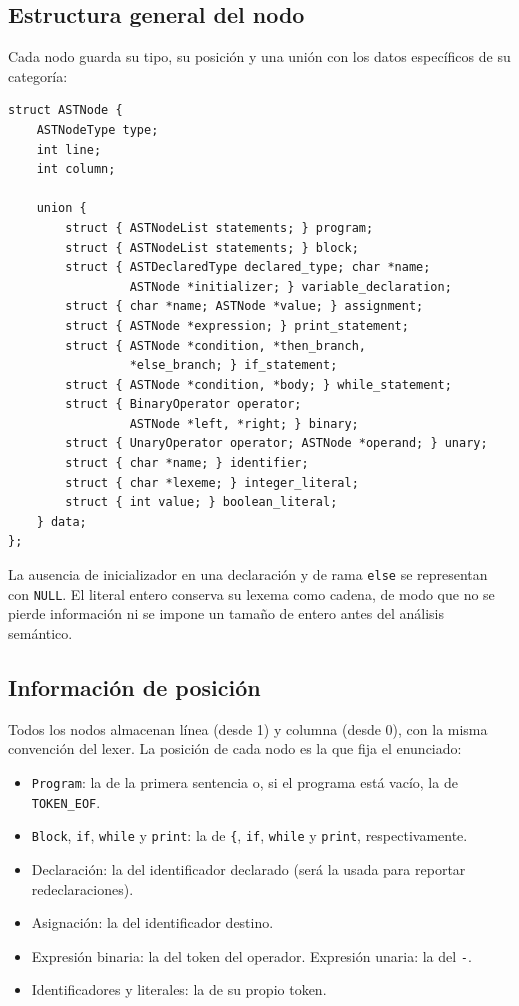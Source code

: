 \documentclass[12pt,letterpaper]{article}
\begin{document}
\subsection*{Estructura general del nodo}

Cada nodo guarda su tipo, su posición y una unión con los datos específicos de su categoría:

\begin{lstlisting}[style=modernc, caption={Estructura \texttt{ASTNode} (resumida).}]
struct ASTNode {
    ASTNodeType type;
    int line;
    int column;

    union {
        struct { ASTNodeList statements; } program;
        struct { ASTNodeList statements; } block;
        struct { ASTDeclaredType declared_type; char *name;
                 ASTNode *initializer; } variable_declaration;
        struct { char *name; ASTNode *value; } assignment;
        struct { ASTNode *expression; } print_statement;
        struct { ASTNode *condition, *then_branch,
                 *else_branch; } if_statement;
        struct { ASTNode *condition, *body; } while_statement;
        struct { BinaryOperator operator;
                 ASTNode *left, *right; } binary;
        struct { UnaryOperator operator; ASTNode *operand; } unary;
        struct { char *name; } identifier;
        struct { char *lexeme; } integer_literal;
        struct { int value; } boolean_literal;
    } data;
};
\end{lstlisting}

\bigskip

La ausencia de inicializador en una declaración y de rama \texttt{else} se representan con \texttt{NULL}. El
literal entero conserva su lexema como cadena, de modo que no se pierde información ni se impone un tamaño de
entero antes del análisis semántico.

\subsection*{Información de posición}

Todos los nodos almacenan línea (desde 1) y columna (desde 0), con la misma convención del lexer. La posición
de cada nodo es la que fija el enunciado:

\begin{itemize}
\item \texttt{Program}: la de la primera sentencia o, si el programa está vacío, la de \texttt{TOKEN\_EOF}.
\item \texttt{Block}, \texttt{if}, \texttt{while} y \texttt{print}: la de \texttt{\{}, \texttt{if},
  \texttt{while} y \texttt{print}, respectivamente.
\item Declaración: la del identificador declarado (será la usada para reportar redeclaraciones).
\item Asignación: la del identificador destino.
\item Expresión binaria: la del token del operador. Expresión unaria: la del \texttt{-}.
\item Identificadores y literales: la de su propio token.
\end{itemize}
\end{document}
